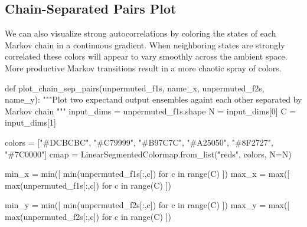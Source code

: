 \documentclass[
  letterpaper,
  DIV=11,
  numbers=noendperiod]{scrartcl}
\newenvironment{Shaded}{\begin{snugshade}}{\end{snugshade}}
\newcommand{\BuiltInTok}[1]{\textcolor[rgb]{0.00,0.23,0.31}{#1}}
\newcommand{\CommentTok}[1]{\textcolor[rgb]{0.37,0.37,0.37}{#1}}
\newcommand{\ControlFlowTok}[1]{\textcolor[rgb]{0.00,0.23,0.31}{#1}}
\newcommand{\DecValTok}[1]{\textcolor[rgb]{0.68,0.00,0.00}{#1}}
\newcommand{\KeywordTok}[1]{\textcolor[rgb]{0.00,0.23,0.31}{#1}}
\newcommand{\NormalTok}[1]{\textcolor[rgb]{0.00,0.23,0.31}{#1}}
\newcommand{\OperatorTok}[1]{\textcolor[rgb]{0.37,0.37,0.37}{#1}}
\newcommand{\StringTok}[1]{\textcolor[rgb]{0.13,0.47,0.30}{#1}}
\begin{document}
\hypertarget{chain-separated-pairs-plot}{%
\subsection{Chain-Separated Pairs
Plot}\label{chain-separated-pairs-plot}}

We can also visualize strong autocorrelations by coloring the states of
each Markov chain in a continuous gradient. When neighboring states are
strongly correlated these colors will appear to vary smoothly across the
ambient space. More productive Markov transitions result in a more
chaotic spray of colors.

\begin{Shaded}
\begin{Highlighting}[]
\KeywordTok{def}\NormalTok{ plot\_chain\_sep\_pairs(unpermuted\_f1s, name\_x,}
\NormalTok{                         unpermuted\_f2s, name\_y):}
  \CommentTok{"""Plot two expectand output ensembles againt each other separated by}
\CommentTok{     Markov chain """}
\NormalTok{  input\_dims }\OperatorTok{=}\NormalTok{ unpermuted\_f1s.shape}
\NormalTok{  N }\OperatorTok{=}\NormalTok{ input\_dims[}\DecValTok{0}\NormalTok{]}
\NormalTok{  C }\OperatorTok{=}\NormalTok{ input\_dims[}\DecValTok{1}\NormalTok{]}

\NormalTok{  colors }\OperatorTok{=}\NormalTok{ [}\StringTok{"\#DCBCBC"}\NormalTok{, }\StringTok{"\#C79999"}\NormalTok{, }\StringTok{"\#B97C7C"}\NormalTok{,}
            \StringTok{"\#A25050"}\NormalTok{, }\StringTok{"\#8F2727"}\NormalTok{, }\StringTok{"\#7C0000"}\NormalTok{]}
\NormalTok{  cmap }\OperatorTok{=}\NormalTok{ LinearSegmentedColormap.from\_list(}\StringTok{"reds"}\NormalTok{, colors, N}\OperatorTok{=}\NormalTok{N)}

\NormalTok{  min\_x }\OperatorTok{=} \BuiltInTok{min}\NormalTok{([ }\BuiltInTok{min}\NormalTok{(unpermuted\_f1s[:,c]) }\ControlFlowTok{for}\NormalTok{ c }\KeywordTok{in} \BuiltInTok{range}\NormalTok{(C) ])}
\NormalTok{  max\_x }\OperatorTok{=} \BuiltInTok{max}\NormalTok{([ }\BuiltInTok{max}\NormalTok{(unpermuted\_f1s[:,c]) }\ControlFlowTok{for}\NormalTok{ c }\KeywordTok{in} \BuiltInTok{range}\NormalTok{(C) ])}
  
\NormalTok{  min\_y }\OperatorTok{=} \BuiltInTok{min}\NormalTok{([ }\BuiltInTok{min}\NormalTok{(unpermuted\_f2s[:,c]) }\ControlFlowTok{for}\NormalTok{ c }\KeywordTok{in} \BuiltInTok{range}\NormalTok{(C) ])}
\NormalTok{  max\_y }\OperatorTok{=} \BuiltInTok{max}\NormalTok{([ }\BuiltInTok{max}\NormalTok{(unpermuted\_f2s[:,c]) }\ControlFlowTok{for}\NormalTok{ c }\KeywordTok{in} \BuiltInTok{range}\NormalTok{(C) ])}
  

\end{Highlighting}
\end{Shaded}
\end{document}
